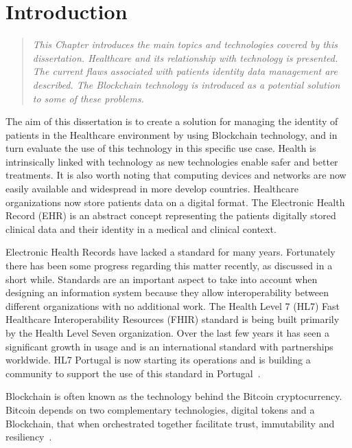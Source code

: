 \chapter{Introduction}
\label{introduction}

\begin{quote} 
  \emph{This Chapter introduces the main topics and technologies covered by
  this dissertation. Healthcare and its relationship with technology is
  presented. The current flaws associated with patients identity data
  management are described. The Blockchain technology is introduced as a
  potential solution to some of these problems.} 
\end{quote}

The aim of this dissertation is to create a solution for managing the identity
of patients in the Healthcare environment by using Blockchain technology, and
in turn evaluate the use of this technology in this specific use case.  Health
is intrinsically linked with technology as new technologies enable safer and
better treatments. It is also worth noting that computing devices and networks
are now easily available and widespread in more develop countries.  Healthcare
organizations now store patients data on a digital format. The Electronic
Health Record (EHR) is an abstract concept representing the patients digitally
stored clinical data and their identity in a medical and clinical context.

Electronic Health Records  have lacked a standard for many years. Fortunately
there has been some progress regarding this matter recently, as discussed in a
short while.  Standards are an important aspect to take into account when
designing an information system because they allow interoperability between
different organizations with no additional work. The Health Level 7 (HL7) Fast
Healthcare Interoperability Resources (FHIR) standard is being built primarily
by the Health Level Seven organization. Over the last few years it has seen a
significant growth in usage and is an international standard with partnerships
worldwide. HL7 Portugal is now starting its operations and is building a
community to support the use of this standard in Portugal~\cite{HealthLevel7}.

Blockchain is often known as the technology behind the Bitcoin cryptocurrency.
Bitcoin depends on two complementary technologies, digital tokens and a
Blockchain, that when orchestrated together facilitate trust, immutability and
resiliency~\cite{Evans2016}.

